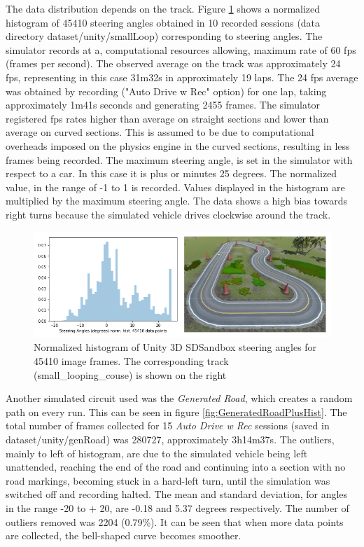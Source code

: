 The data distribution depends on the track. Figure \ref{fig:GeneratedTrackPlusHist} shows a normalized histogram of 45410 steering angles obtained in 10 recorded sessions (data directory dataset/unity/smallLoop) corresponding to steering angles. The simulator records at a, computational resources allowing, maximum rate of 60 fps (frames per second). The observed average on the track was approximately 24 fps, representing in this case 31m32s  in approximately 19 laps. The 24 fps average was obtained by recording ("Auto Drive w Rec" option) for one lap, taking approximately 1m41s seconds and generating 2455 frames. The simulator registered fps rates higher than average on straight sections and lower than average on curved sections. This is assumed to be due to computational overheads imposed on the physics engine in the curved sections, resulting in less frames being recorded. The maximum steering angle, is set in the simulator with respect to a car. In this case it is plus or minutes 25 degrees. The normalized value, in the range of -1 to 1 is recorded. Values displayed in the histogram are multiplied by the maximum steering angle. The data shows a high bias towards right turns because the simulated vehicle drives clockwise around the track.
\begin{figure}[ht]
 \centering 
 \includegraphics[width=\textwidth]{Figures/GeneratedTrackPlusHistogram.png}
 \caption{Normalized histogram of Unity 3D SDSandbox steering angles for 45410 image frames. The corresponding track (small\_looping\_couse) is shown on the right}
 \label{fig:GeneratedTrackPlusHist}
\end{figure}

Another simulated circuit used was the \textit{Generated Road}, which creates a random path on every run. This can be seen in figure \ref{fig:GeneratedRoadPlusHist}. The total number of frames collected for 15 \textit{Auto Drive w Rec} sessions (saved in dataset/unity/genRoad) was 280727, approximately 3h14m37s. The outliers, mainly to left of histogram, are due to the simulated vehicle being left unattended, reaching the end of the road and continuing into a section with no road markings, becoming stuck in a hard-left turn, until the simulation was switched off and recording halted. The mean and standard deviation, for angles in the range -20 to + 20, are -0.18 and 5.37 degrees respectively. The number of outliers removed was 2204 (0.79\%). It can be seen that when more data points are collected, the bell-shaped curve becomes smoother.

